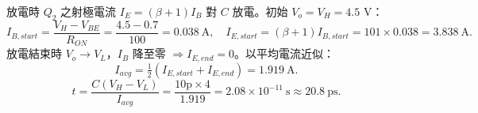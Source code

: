 \documentclass[12pt]{article}
\begin{document}
\sol 放電時 $Q_2$ 之射極電流 $I_E=(\beta+1)I_B$ 對 $C$ 放電。初始 $V_o=V_H=4.5$ V：
\[ I_{B,start}=\frac{V_H-V_{BE}}{R_{ON}}=\frac{4.5-0.7}{100}=0.038\ \text{A},\quad
   I_{E,start}=(\beta+1)I_{B,start}=101\times0.038=3.838\ \text{A}. \]
放電結束時 $V_o\to V_L$，$I_B$ 降至零 $\Rightarrow I_{E,end}=0$。以平均電流近似：
\[ I_{avg}=\tfrac12(I_{E,start}+I_{E,end})=1.919\ \text{A}. \]
\[ t=\frac{C(V_H-V_L)}{I_{avg}}=\frac{10\text{p}\times4}{1.919}=2.08\times10^{-11}\ \text{s}\approx20.8\ \text{ps}. \]
\end{document}
